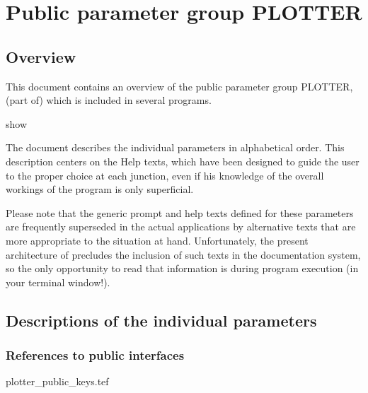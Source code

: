 
\chapter{ Public parameter group PLOTTER}
\tableofcontents


\section{ Overview}

	This document contains an overview of the public parameter group
PLOTTER, (part of) which is included in several \NEWSTAR programs.

show


	The
document describes the individual parameters in alphabetical order. This
description centers on the Help texts, which have been designed to guide the
user to the proper choice at each junction, even if his knowledge of the
overall workings of the program is only superficial.

	Please note that the generic prompt and help texts defined for these
parameters are frequently superseded in the actual applications by alternative
texts that are more appropriate to the situation at hand. Unfortunately, the
present architecture of \NEWSTAR precludes the inclusion of such texts in the
documentation system, so the only opportunity to read that information is
during program execution (in your terminal window!).


\section{ Descriptions of the individual parameters}
\label{.descriptions}

\subsection{ References to public interfaces}
\label{.public}

 {plotter_public_keys.tef}
